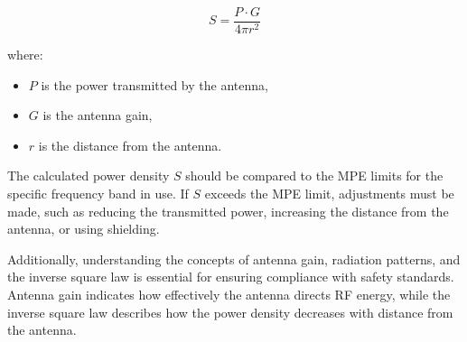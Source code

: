 \[
S = \frac{P \cdot G}{4 \pi r^2}
\]

where:
\begin{itemize}
    \item \( P \) is the power transmitted by the antenna,
    \item \( G \) is the antenna gain,
    \item \( r \) is the distance from the antenna.
\end{itemize}

The calculated power density \( S \) should be compared to the MPE limits for the specific frequency band in use. If \( S \) exceeds the MPE limit, adjustments must be made, such as reducing the transmitted power, increasing the distance from the antenna, or using shielding.

Additionally, understanding the concepts of antenna gain, radiation patterns, and the inverse square law is essential for ensuring compliance with safety standards. Antenna gain indicates how effectively the antenna directs RF energy, while the inverse square law describes how the power density decreases with distance from the antenna.

